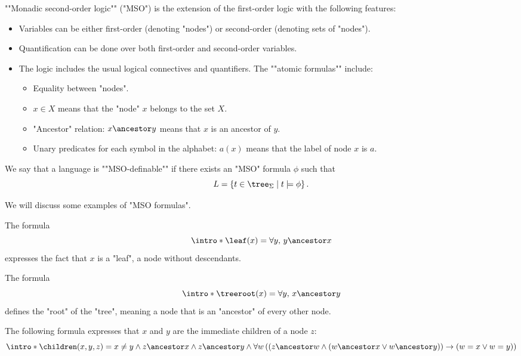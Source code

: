 \documentclass[a4paper,UKenglish,cleveref, autoref, thm-restate]{lipics-v2021}
\begin{document}
\begin{definition}
	\AP ""Monadic second-order logic"" (\reintro*"MSO") is the extension of the first-order logic with the following features:
	\begin{itemize}
		\item Variables can be either first-order (denoting "nodes") or second-order (denoting sets of "nodes").
		\item Quantification can be done over both first-order and second-order variables.
		\item The logic includes the usual logical connectives and quantifiers.
		      \itemAP The ""atomic formulas"" include:
		      \begin{itemize}
			      \item Equality between "nodes".
			      \item $x \in X$ means that the "node" $x$ belongs to the set $X$.
			      \item "Ancestor" relation: \( x \ancestor y \) means that \( x \) is an ancestor of \( y \).
			      \item Unary predicates for each symbol in the alphabet: \( a(x) \) means that the label of node \( x \) is \( a \).
		      \end{itemize}
	\end{itemize}
\end{definition}

\begin{definition}
	\AP We say that a language is ""MSO-definable"" if there exists an "MSO" formula \( \phi \) such that
	\[
		L = \setdef{t \in \tree_{\Sigma}}{t \models \phi}.
	\]
\end{definition}


We will discuss some examples of "MSO formulas".

\begin{example}
	\AP The formula
	\[
		\intro* \leaf(x) = \forall y,\, y \ancestor x
	\]
	expresses the fact that $x$ is a "leaf", a node without descendants.
\end{example}

\begin{example}
	\AP The formula
	\[
		\intro* \treeroot(x) = \forall y,\, x \ancestor y
	\]
	defines the "root" of the "tree", meaning a node that is an "ancestor" of every other node.
\end{example}

\begin{example}
	\AP The following formula expresses that $x$ and $y$ are the immediate children of a node $z$:
	\[
		\intro* \children(x,y,z) =
		x \neq y \land
		z \ancestor x \land  z \ancestor y \land
		\forall w
		\left( \left(
			z \ancestor w \land
				(w \ancestor x \lor w \ancestor  y) \right) \rightarrow (
			w = x \lor w = y
			)
		\right)
	\]
\end{example}
\end{document}

